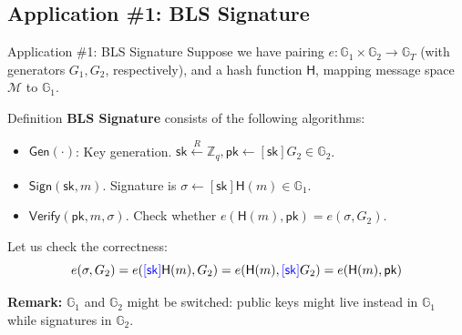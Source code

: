 \documentclass[xcolor={usenames,dvipsnames}]{beamer}
\begin{document}
    \subsection{Application \#1: BLS Signature}
    \begin{frame}{Application \#1: BLS Signature}
        Suppose we have pairing $e: \mathbb{G}_1 \times \mathbb{G}_2 \to \mathbb{G}_T$ (with generators $G_1,G_2$, respectively), and a hash function $\mathsf{H}$, mapping message space $\mathcal{M}$ to $\mathbb{G}_1$.
        
        \begin{block}{Definition}
            \textbf{BLS Signature} consists of the following algorithms:
            \begin{itemize}
                \item $\mathsf{Gen}(\cdot)$: Key generation. $\mathsf{sk} \xleftarrow[]{R} \mathbb{Z}_q, \mathsf{pk} \gets [\mathsf{sk}] G_2 \in \mathbb{G}_2$.
                \item $\mathsf{Sign}(\mathsf{sk},m)$. Signature is $\sigma \gets [\mathsf{sk}] \mathsf{H}(m) \in \mathbb{G}_1$.
                \item $\mathsf{Verify}(\mathsf{pk},m,\sigma)$. Check whether $e(\mathsf{H}(m), \mathsf{pk}) = e(\sigma, G_2)$. 
            \end{itemize}
        \end{block}
        
        Let us check the correctness:
        \begin{equation*}
            e(\sigma,G_2) = e(\textcolor{blue}{[\mathsf{sk}]}\mathsf{H}(m),G_2) = e(\mathsf{H}(m), \textcolor{blue}{[\mathsf{sk}]}G_2) = e(\mathsf{H}(m), \mathsf{pk})
        \end{equation*}
        
        \textbf{Remark:} $\mathbb{G}_1$ and $\mathbb{G}_2$ might be switched: public keys might live instead in $\mathbb{G}_1$ while signatures in $\mathbb{G}_2$.
    \end{frame}
\end{document}
